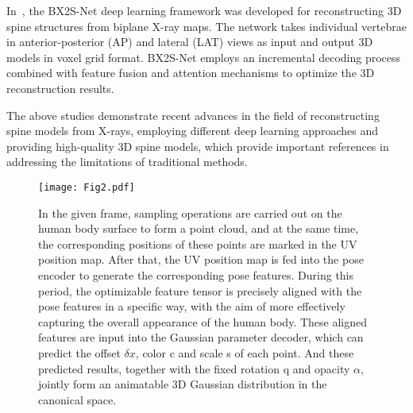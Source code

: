 In~\cite{chen2023bx2s}, the BX2S-Net deep learning framework was developed for reconstructing 3D spine structures from biplane X-ray maps. The network takes individual vertebrae in anterior-posterior (AP) and lateral (LAT) views as input and output 3D models in voxel grid format. BX2S-Net employs an incremental decoding process combined with feature fusion and attention mechanisms to optimize the 3D reconstruction results.
\par The above studies demonstrate recent advances in the field of reconstructing spine models from X-rays, employing different deep learning approaches and providing high-quality 3D spine models, which provide important references in addressing the limitations of traditional methods. 

\begin{figure*}
	\centering
     \texttt{[image: Fig2.pdf]}
	\caption{In the given frame, sampling operations are carried out on the human body surface to form a point cloud, and at the same time, the corresponding positions of these points are marked in the UV position map. After that, the UV position map is fed into the pose encoder to generate the corresponding pose features. During this period, the optimizable feature tensor is precisely aligned with the pose features in a specific way, with the aim of more effectively capturing the overall appearance of the human body. These aligned features are input into the Gaussian parameter decoder, which can predict the offset $\delta x$, color c and scale s of each point. And these predicted results, together with the fixed rotation q and opacity $\alpha$, jointly form an animatable 3D Gaussian distribution in the canonical space.}
    \label{network}
\end{figure*}

